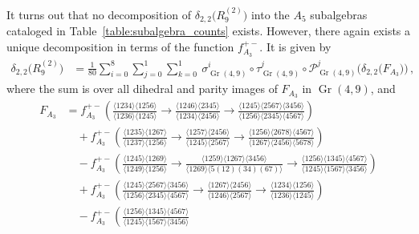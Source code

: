 \documentclass[11pt]{article}
\DeclareMathOperator{\Gr}{Gr}
\begin{document}
It turns out that no decomposition of $\delta_{2,2} \big(R^{(2)}_9\big)$ into the $A_5$ subalgebras cataloged in Table~\ref{table:subalgebra_counts} exists. However, there again exists a unique decomposition in terms of the function $f_{A_3}^{+-}$. It is given by
\begin{align}\label{eq:r29A3}
\delta_{2,2} \big(R^{(2)}_9\big) &= \frac{1}{80} \sum_{i = 0}^8 \sum_{j=0}^1 \sum_{k=0}^1 \ \sigma_{\Gr(4,9)}^i \circ \tau_{\Gr(4,9)}^j \circ {\mathcal{P}}_{\Gr(4,9)}^j   \Big(\delta_{2,2} \big(F_{A_3} \big)\Big) \, ,
\end{align}
where the sum is over all dihedral and parity images of $F_{A_3}$ in $\Gr(4,9)$, and
\begin{align}
F_{A_3}  &= f_{A_3}^{+-} \left( \tfrac{\langle 1234 \rangle \langle 1256 \rangle}{\langle 1236 \rangle \langle 1245 \rangle} \! 
    \to \! \tfrac{\langle 1246\rangle \langle 2345 \rangle}{\langle 1234 \rangle \langle 2456 \rangle} \! 
    \to \! \tfrac{\langle 1245\rangle \langle 2567 \rangle \langle 3456 \rangle }{\langle 1256 \rangle \langle 2345 \rangle \langle 4567 \rangle} \right) \nonumber \\
&\quad+ f_{A_3}^{+-} \left( \tfrac{\langle 1235 \rangle \langle 1267 \rangle}{\langle 1237 \rangle  \langle 1256 \rangle} \! 
    \to \! \tfrac{\langle 1257 \rangle \langle 2456 \rangle}{\langle 1245 \rangle \langle 2567 \rangle} \! 
    \to \! \tfrac{\langle 1256 \rangle \langle 2678 \rangle \langle 4567 \rangle}{\langle 1267 \rangle \langle 2456 \rangle \langle 5678 \rangle} \right) \nonumber \\
&\quad- f_{A_3}^{+-} \left( \tfrac{\langle 1245 \rangle \langle 1269 \rangle}{\langle 1249 \rangle \langle 1256 \rangle} \! 
    \to \! \tfrac{\langle 1259 \rangle \langle 1267 \rangle \langle 3456 \rangle}{\langle 1269 \rangle \langle 5(12)(34)(67) \rangle} \! 
    \to \! \tfrac{\langle 1256 \rangle \langle 1345 \rangle \langle 4567 \rangle}{\langle 1245 \rangle \langle 1567 \rangle \langle 3456 \rangle} \right) \nonumber \\
&\quad+ f_{A_3}^{+-} \left( \tfrac{\langle 1245 \rangle \langle 2567 \rangle \langle 3456 \rangle}{\langle 1256 \rangle \langle 2345 \rangle \langle 4567 \rangle} \! 
    \to \! \tfrac{\langle 1267 \rangle  \langle 2456 \rangle}{\langle 1246 \rangle \langle 2567 \rangle} \! 
    \to \! \tfrac{\langle 1234 \rangle  \langle 1256 \rangle}{\langle 1236 \rangle \langle 1245 \rangle} \right) \nonumber \\
&\quad- f_{A_3}^{+-} \left(\tfrac{\langle 1256 \rangle \langle 1345 \rangle \langle 4567 \rangle}{\langle 1245 \rangle \langle 1567 \rangle \langle 3456 \rangle} \! 

\end{align}
\end{document}
